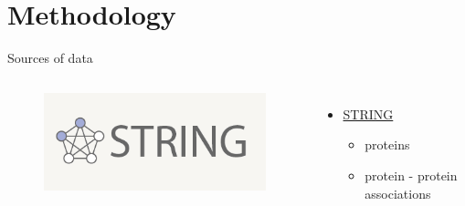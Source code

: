\documentclass{beamer}
\begin{document}

\section{Methodology}
\begin{frame}{Sources of data}
\begin{columns}[c] %

\begin{figure}
    \centering
    \includegraphics[width=1\linewidth]{string_logo.png}
\end{figure}
\begin{itemize}
    \item \href{https://string-db.org/}{STRING}
    \begin{itemize}
        \item proteins
        \item protein - protein associations
    \end{itemize}
\end{itemize}


\end{columns}
\end{frame}
\end{document}

